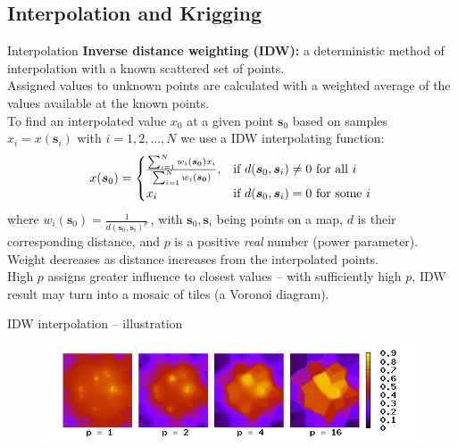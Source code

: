 \documentclass{beamer}
\begin{document}
\subsection{Interpolation and Krigging}
\begin{frame}{Interpolation}
\small
\textbf{Inverse distance weighting (IDW):} a deterministic method of interpolation with a known scattered set of points. \\ \smallskip Assigned values to unknown points are calculated with a weighted average of the values available at the known points.
\\ \smallskip 
To find an interpolated value $x_0$ at a given point $\bm{s}_0$ based on samples $x_i=x(\bm{s}_i)$ with $i=1,2,\dots,N$ we use a IDW interpolating function:
$$
x(\bm{s}_0) = 
\begin{cases}
    \frac{\sum_{i=1}^N w_i(\bm{s_0})x_i}{\sum_{i=1}^N w_i(\bm{s_0})}, & 
    \textnormal{if~} d(\bm{s}_0,\bm{s}_i) \neq 0 \textnormal{~for all~}i\\
    x_i & \textnormal{if~} d(\bm{s}_0,\bm{s}_i)=0 \textnormal{~for some~}i \, 
\end{cases} 
$$
where $w_i(\bm{s}_0)=\frac{1}{d(\bm{s}_0,\bm{s}_i)^p}\,$, with $\bm{s}_0, \bm{s}_i$ being points on a map, $d$ is their corresponding distance, and $p$ is a positive \textit{real} number (power parameter). \\ \medskip
Weight decreases as distance increases from the interpolated points. \\High $p$ assigns greater influence to closest values -- with sufficiently high $p$, IDW result may turn into a mosaic of tiles (a Voronoi diagram). 
\end{frame}
\begin{frame}{IDW interpolation -- illustration}
\begin{figure}
	\includegraphics[width=.7\textwidth]{IMG/sp_idw.png}
\end{figure}
\end{frame}
\end{document}
